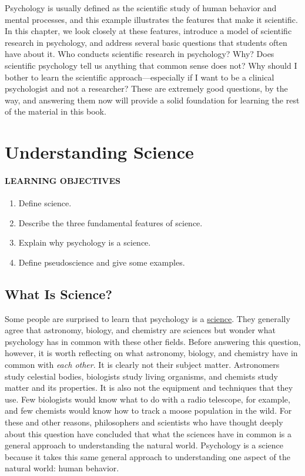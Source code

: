 \documentclass[
]{krantz}
\providecommand{\tightlist}{%
  \setlength{\itemsep}{0pt}\setlength{\parskip}{0pt}}
\begin{document}
Psychology is usually defined as the scientific study of human behavior and mental processes, and this example illustrates the features that make it scientific. In this chapter, we look closely at these features, introduce a model of scientific research in psychology, and address several basic questions that students often have about it. Who conducts scientific research in psychology? Why? Does scientific psychology tell us anything that common sense does not? Why should I bother to learn the scientific approach---especially if I want to be a clinical psychologist and not a researcher? These are extremely good questions, by the way, and answering them now will provide a solid foundation for learning the rest of the material in this book.

\hypertarget{understanding-science}{%
\section{Understanding Science}\label{understanding-science}}

\hypertarget{learning-objectives}{%
\paragraph*{LEARNING OBJECTIVES}\label{learning-objectives}}

\begin{enumerate}
\def\labelenumi{\arabic{enumi}.}
\tightlist
\item
  Define science.
\item
  Describe the three fundamental features of science.
\item
  Explain why psychology is a science.
\item
  Define pseudoscience and give some examples.
\end{enumerate}

\hypertarget{what-is-science}{%
\subsection*{What Is Science?}\label{what-is-science}}


Some people are surprised to learn that psychology is a \protect\hyperlink{science}{science}. They generally agree that astronomy, biology, and chemistry are sciences but wonder what psychology has in common with these other fields. Before answering this question, however, it is worth reflecting on what astronomy, biology, and chemistry have in common with \emph{each other}. It is clearly not their subject matter. Astronomers study celestial bodies, biologists study living organisms, and chemists study matter and its properties. It is also not the equipment and techniques that they use. Few biologists would know what to do with a radio telescope, for example, and few chemists would know how to track a moose population in the wild. For these and other reasons, philosophers and scientists who have thought deeply about this question have concluded that what the sciences have in common is a general approach to understanding the natural world. Psychology is a science because it takes this same general approach to understanding one aspect of the natural world: human behavior.
\end{document}
